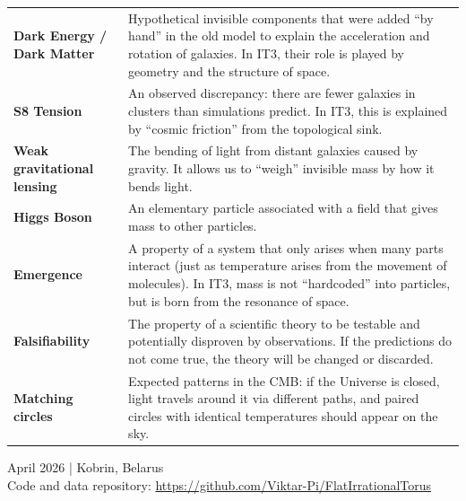 \documentclass[12pt,a4paper,oneside]{book}
\begin{document}
\begin{longtable}{>{\bfseries}p{4.5cm}p{10cm}}
\textbf{Dark Energy / Dark Matter} & Hypothetical invisible components that were added “by hand” in the old model to explain the acceleration and rotation of galaxies. In IT3, their role is played by geometry and the structure of space. \\
\textbf{S8 Tension} & An observed discrepancy: there are fewer galaxies in clusters than simulations predict. In IT3, this is explained by “cosmic friction” from the topological sink. \\
\textbf{Weak gravitational lensing} & The bending of light from distant galaxies caused by gravity. It allows us to “weigh” invisible mass by how it bends light. \\
\textbf{Higgs Boson} & An elementary particle associated with a field that gives mass to other particles. \\
\textbf{Emergence} & A property of a system that only arises when many parts interact (just as temperature arises from the movement of molecules). In IT3, mass is not “hardcoded” into particles, but is born from the resonance of space. \\
\textbf{Falsifiability} & The property of a scientific theory to be testable and potentially disproven by observations. If the predictions do not come true, the theory will be changed or discarded. \\
\textbf{Matching circles} & Expected patterns in the CMB: if the Universe is closed, light travels around it via different paths, and paired circles with identical temperatures should appear on the sky. \\
\end{longtable}

\vspace{2cm}
\begin{flushright}
\small April 2026 | Kobrin, Belarus\\
\small Code and data repository: \url{https://github.com/Viktar-Pi/FlatIrrationalTorus}
\end{flushright}

\end{document}
